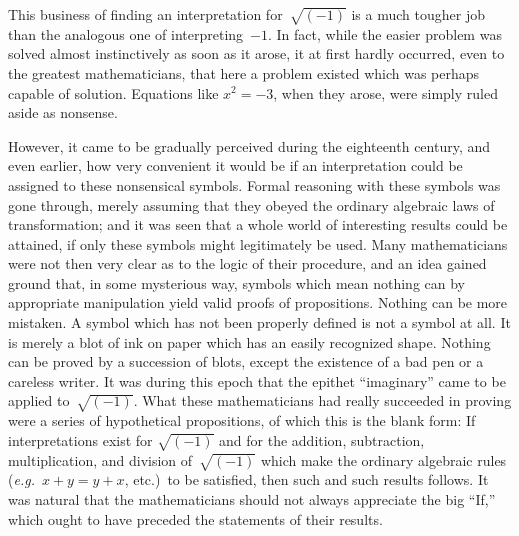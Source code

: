 \documentclass[12pt,leqno]{book}[2005/09/16]
\newcommand{\PageSep}[1]{\ignorespaces}
\newcommand{\eg}{\emph{e.g.}}
\begin{document}
This business of finding an interpretation
for~$\sqrt{(-1)}$ is a much tougher job than the
analogous one of interpreting~$-1$. In fact,
while the easier problem was solved almost
instinctively as soon as it arose, it at first
hardly occurred, even to the greatest mathematicians,
that here a problem existed which
was perhaps capable of solution. Equations
like $x^{2} = -3$, when they arose, were simply
ruled aside as nonsense.

However, it came to be gradually perceived
during the eighteenth century, and even
earlier, how very convenient it would be if
an interpretation could be assigned to these
nonsensical symbols. Formal reasoning with
these symbols was gone through, merely
assuming that they obeyed the ordinary
\PageSep{91}
algebraic laws of transformation; and it was
seen that a whole world of interesting results
could be attained, if only these symbols might
legitimately be used. Many mathematicians
were not then very clear as to the logic of
their procedure, and an idea gained ground
that, in some mysterious way, symbols which
mean nothing can by appropriate manipulation
yield valid proofs of propositions. Nothing
can be more mistaken. A symbol
which has not been properly defined is not a
symbol at all. It is merely a blot of ink on
paper which has an easily recognized shape.
Nothing can be proved by a succession of
blots, except the existence of a bad pen or a
careless writer. It was during this epoch
that the epithet ``imaginary'' came to be
applied to~$\sqrt{(-1)}$. What these mathematicians
had really succeeded in proving were
a series of hypothetical propositions, of which
this is the blank form: If interpretations
exist for $\sqrt{(-1)}$ and for the addition, subtraction,
multiplication, and division of~$\sqrt{(-1)}$
which make the ordinary algebraic
rules (\eg\ $x + y = y + x$, etc.)\ to be satisfied,
then such and such results follows. It was
natural that the mathematicians should not
always appreciate the big ``If,'' which ought
to have preceded the statements of their results.
\end{document}
